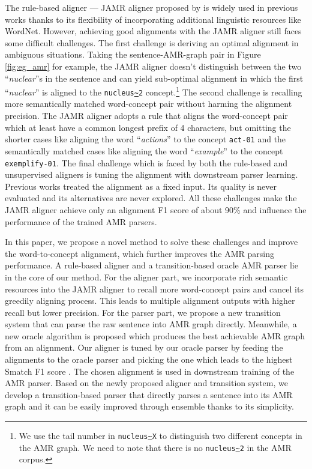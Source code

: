 \documentclass[11pt,a4paper]{article}
\begin{document}
The rule-based aligner --- JAMR aligner proposed by \citet{flanigan-EtAl:2014:P14-1}
is widely used in previous works 
thanks to its flexibility of incorporating additional linguistic resources
like WordNet.
However, achieving good alignments with the JAMR aligner still faces some difficult challenges.
The first challenge is deriving an optimal alignment in ambiguous situations.
Taking the sentence-AMR-graph pair in Figure \ref{fig:eg_amr} for example,
the JAMR aligner doesn't distinguish between the two ``{\it nuclear}''s in the sentence
and can yield sub-optimal alignment in which the first ``{\it nuclear}'' is aligned
to the {\tt nucleus\url{~}2} concept.\footnote{We use the tail number in {\tt nucleus\url{~}X}
to distinguish two different concepts in the AMR graph.
We need to note that there is no {\tt nucleus\url{~}2} in the AMR corpus.}
The second challenge is recalling more semantically matched word-concept pair
without harming the alignment precision.
The JAMR aligner adopts a rule that aligns the word-concept pair
which at least have a common longest prefix of 4 characters,
but omitting the shorter cases like aligning the word ``\textit{actions}'' to the concept \texttt{act-01}
and the semantically matched cases like aligning the word ``\textit{example}'' to the concept \texttt{exemplify-01}.
The final challenge which is faced by both the rule-based and unsupervised aligners
is tuning the alignment with downstream parser learning.
Previous works treated the alignment as a fixed input.
Its quality is never evaluated and its alternatives are never explored.
All these challenges make the JAMR aligner achieve only an alignment F1 score
of about 90\% and
influence the performance of the trained AMR parsers.

In this paper, we propose a novel method to solve these challenges and
improve the word-to-concept alignment,
which further improves the AMR parsing performance.
A rule-based aligner and 
a transition-based oracle AMR parser
lie in the core of our method.
For the aligner part, we
incorporate rich semantic resources into the JAMR aligner
to recall more word-concept pairs
and cancel its greedily aligning process. 
This leads to multiple alignment outputs with higher recall but lower precision.
For the parser part,
we propose a new transition system that can parse the raw
sentence into AMR graph directly.
Meanwhile, a new oracle algorithm is proposed which
produces the best achievable AMR graph from an alignment.
Our aligner is tuned by our oracle parser by feeding the alignments
to the oracle parser and picking the one which leads to
the highest Smatch F1 score \cite{cai-knight:2013:Short}.
The chosen alignment is used in downstream training of the AMR parser.
Based on the newly proposed aligner and transition system,
we develop a transition-based parser that directly parses a sentence
into its AMR graph and it can be easily improved through ensemble
thanks to its simplicity.
\end{document}
